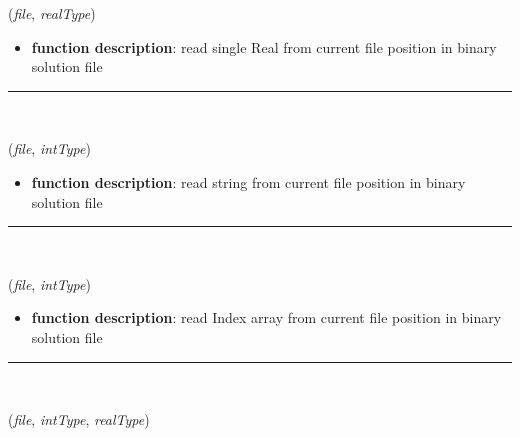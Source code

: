 \begin{itemize}[leftmargin=1.4cm]
\begin{itemize}[leftmargin=1.4cm]
\begin{itemize}[leftmargin=1.4cm]
\begin{itemize}[leftmargin=0.5cm]
\begin{flushleft}
({\it file}, {\it realType})
\end{flushleft}
\setlength{\itemindent}{0.7cm}
\begin{itemize}[leftmargin=0.7cm]
\item[--]
{\bf function description}: read single Real from current file position in binary solution file
\vspace{12pt}\end{itemize}
%
\noindent\rule{8cm}{0.75pt}\vspace{1pt} \\ 
\begin{flushleft}
\label{sec:basicUtilities:BinaryReadString}
({\it file}, {\it intType})
\end{flushleft}
\setlength{\itemindent}{0.7cm}
\begin{itemize}[leftmargin=0.7cm]
\item[--]
{\bf function description}: read string from current file position in binary solution file
\vspace{12pt}\end{itemize}
%
\noindent\rule{8cm}{0.75pt}\vspace{1pt} \\ 
\begin{flushleft}
\label{sec:basicUtilities:BinaryReadArrayIndex}
({\it file}, {\it intType})
\end{flushleft}
\setlength{\itemindent}{0.7cm}
\begin{itemize}[leftmargin=0.7cm]
\item[--]
{\bf function description}: read Index array from current file position in binary solution file
\vspace{12pt}\end{itemize}
%
\noindent\rule{8cm}{0.75pt}\vspace{1pt} \\ 
\begin{flushleft}
\label{sec:basicUtilities:BinaryReadRealVector}
({\it file}, {\it intType}, {\it realType})
\end{flushleft}
\setlength{\itemindent}{0.7cm}
\begin{itemize}[leftmargin=0.7cm]

\end{itemize}
\end{itemize}
\end{itemize}
\end{itemize}
\end{itemize}
